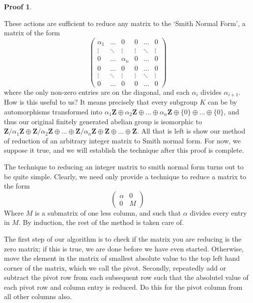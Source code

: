 \documentclass[12pt]{amsbook}
\theoremstyle{definition}
\newtheorem*{prf}{Proof}
\newcommand{\bint}{\mathbf{Z}} %
\begin{document}
\begin{prf}
\begin{itemize}
    \end{itemize}
    These actions are sufficient to reduce any matrix to the `Smith Normal Form', a matrix of the form
    \[ \begin{pmatrix}
            \alpha_1 & \dots  & 0        & 0      & \dots  & 0\\
            \vdots   & \ddots & \vdots   & \vdots & \ddots & \vdots\\
            0        & \dots  & \alpha_n & 0      & \dots  & 0\\
            0        & \dots  & 0        & 0      & \dots  & 0\\
            \vdots   & \ddots & \vdots   & \vdots & \ddots & \vdots\\
            0        & \dots  & 0        & 0      & \dots  & 0
       \end{pmatrix} \]
    where the only non-zero entries are on the diagonal, and each $\alpha_i$ divides $\alpha_{i+1}$. How is this useful to us? It means precisely that every subgroup $K$ can be by automorphisms transformed into $\alpha_1\bint \oplus \alpha_2\bint \oplus \dots \oplus \alpha_n\bint \oplus \{0\} \oplus \dots \oplus \{0\}$, and thus our original finitely generated abelian group is isomorphic to $\bint/\alpha_1\bint \oplus \bint/\alpha_2\bint \oplus \dots \oplus \bint/\alpha_n\bint \oplus \bint \oplus \dots \oplus \bint$. All that is left is show our method of reduction of an arbitrary integer matrix to Smith normal form. For now, we suppose it true, and we will establish the technique after this proof is complete.
\end{prf}

The technique to reducing an integer matrix to smith normal form turns out to be quite simple. Clearly, we need only provide a technique to reduce a matrix to the form
%
\[ \begin{pmatrix} \alpha & 0\\0 & M \end{pmatrix} \]
%
Where $M$ is a submatrix of one less column, and such that $\alpha$ divides every entry in $M$. By induction, the rest of the method is taken care of.

The first step of our algorithm is to check if the matrix you are reducing is the zero matrix; if this is true, we are done before we have even started. Otherwise, move the element in the matrix of smallest absolute value to the top left hand corner of the matrix, which we call the pivot. Secondly, repeatedly add or subtract the pivot row from each subsequent row such that the absolutel value of each pivot row and column entry is reduced. Do this for the pivot column from all other columns also.
\end{document}
